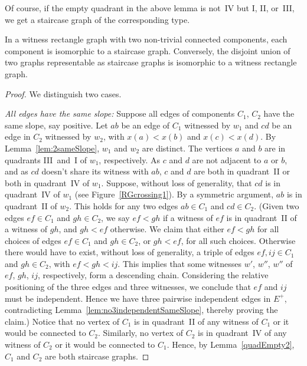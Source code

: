 \documentclass{llncs}
\begin{document}
Of course, if the empty quadrant in the above lemma is not~IV but I,
II, or~III, we get a staircase graph of the corresponding type.

\begin{theorem}
  \label{staircase}
  In a witness rectangle graph with two non-trivial connected
  components, each component is isomorphic to a staircase graph.
  Conversely, the disjoint union of two graphs representable as
  staircase graphs is isomorphic to a witness rectangle graph.
\end{theorem}

\begin{proof}
  We distinguish two cases.

\noindent\emph{All edges have the same slope:}
Suppose all edges of components $C_1$, $C_2$ have the same slope, say
positive.  Let $ab$ be an edge of $C_1$ witnessed by $w_1$ and $cd$ be
an edge in $C_2$ witnessed by $w_2$, with $x(a)<x(b)$ and $x(c)<x(d)$.
By Lemma~\ref{lem:2sameSlope}, $w_1$ and $w_2$ are distinct.  The
vertices $a$ and $b$ are in quadrants III~and~I of $w_1$,
respectively.  As $c$ and $d$ are not adjacent to $a$ or $b$, and as
$cd$ doesn't share its witness with $ab$, $c$ and $d$ are both in
quadrant~II or both in quadrant~IV of $w_1$.  Suppose, without loss of
generality, that $cd$ is in quadrant~IV of $w_1$ (see
Figure~\ref{RGcrossing1}).
By a symmetric argument, $ab$ is in quadrant~II of $w_2$.  This
holds for any two edges $ab \in C_1$ and $cd \in C_2$.  (Given two
edges $ef \in C_1$ and $gh \in C_2$, we say $ef < gh$ if a witness of
$ef$ is in quadrant~II of a witness of $gh$, and $gh < ef$ otherwise.
We claim that either $ef < gh$ for all choices of edges $ef \in C_1$ and
$gh \in C_2$, or $gh < ef$, for all such choices.  Otherwise there
would have to exist, without loss of generality, a triple of edges $ef,
ij \in C_1$ and $gh \in C_2$, with $ef < gh < ij$.  This implies that
some witnesses $w'$, $w''$, $w''$ of $ef$, $gh$, $ij$, respectively,
form a descending chain.  Considering the relative positioning of the
three edges and three witnesses, we conclude that $ef$ and $ij$ must be
independent.   Hence we have three pairwise independent edges in
$E^+$, contradicting Lemma~\ref{lem:no3independentSameSlope}, 
thereby proving the claim.)
Notice that no vertex of $C_1$ is in quadrant~II of any witness of
$C_1$ or it would be connected to $C_2$.  Similarly, no vertex of
$C_2$ is in quadrant~IV of any witness of $C_2$ or it would be
connected to $C_1$.  Hence, by Lemma~\ref{quadEmpty2}, $C_1$ and
$C_2$ are both staircase graphs.


\end{proof}
\end{document}
